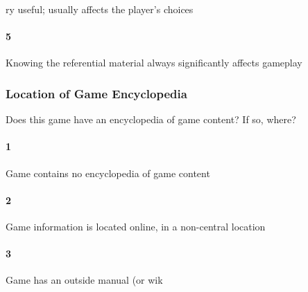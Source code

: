ry useful; usually affects the player's choices\paragraph{5}Knowing the referential material always significantly affects gameplay\subsubsection{Location of Game Encyclopedia}Does this game have an encyclopedia of game content? If so, where?\paragraph{1}Game contains no encyclopedia of game content\paragraph{2}Game information is located online, in a non-central location\paragraph{3}Game has an outside manual (or wik